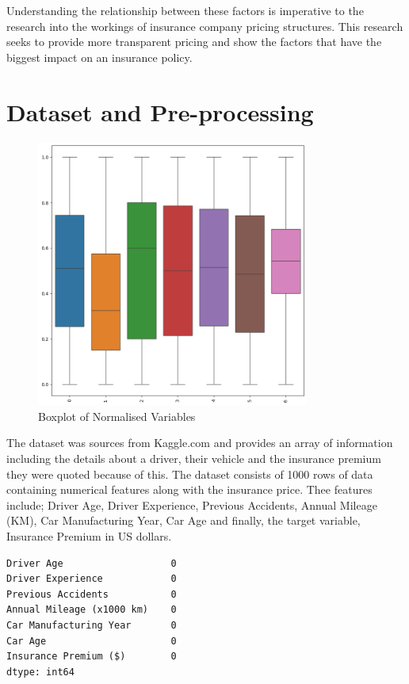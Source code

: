 \documentclass{article}
\begin{document}
Understanding the relationship between these factors is imperative to the research into the workings of insurance company pricing structures. This research seeks to provide more transparent pricing and show the factors that have the biggest impact on an insurance policy.

\newpage
\section{Dataset and Pre-processing}

\begin{figure}[h]
\centering
\includegraphics[width=0.8\textwidth]{boxplot.png}
\caption{Boxplot of Normalised Variables}\label{fig:boxplot}
\end{figure}

The dataset was sources from Kaggle.com and provides an array of information including the details about a driver, their vehicle and the insurance premium they were quoted because of this\cite{Sriram_2025}. The dataset consists of 1000 rows of data containing numerical features along with the insurance price. Thee features include; Driver Age, Driver Experience, Previous Accidents, Annual Mileage (KM), Car Manufacturing Year, Car Age and finally, the target variable, Insurance Premium in US dollars.  

\begin{verbatim}
Driver Age                   0
Driver Experience            0
Previous Accidents           0
Annual Mileage (x1000 km)    0
Car Manufacturing Year       0
Car Age                      0
Insurance Premium ($)        0
dtype: int64
\end{verbatim}
\end{document}
